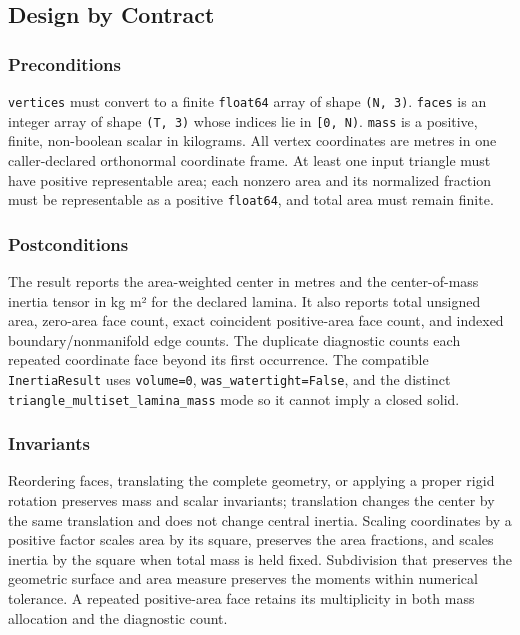 \documentclass[
  american,
]{article}
\begin{document}
\subsection{Design by Contract}\label{design-by-contract-1}

\subsubsection{Preconditions}\label{preconditions-1}

\texttt{vertices} must convert to a finite \texttt{float64} array of
shape \texttt{(N,\ 3)}. \texttt{faces} is an integer array of shape
\texttt{(T,\ 3)} whose indices lie in \texttt{{[}0,\ N)}. \texttt{mass}
is a positive, finite, non-boolean scalar in kilograms. All vertex
coordinates are metres in one caller-declared orthonormal coordinate
frame. At least one input triangle must have positive representable
area; each nonzero area and its normalized fraction must be
representable as a positive \texttt{float64}, and total area must remain
finite.

\subsubsection{Postconditions}\label{postconditions-1}

The result reports the area-weighted center in metres and the
center-of-mass inertia tensor in kg m² for the declared lamina. It also
reports total unsigned area, zero-area face count, exact coincident
positive-area face count, and indexed boundary/nonmanifold edge counts.
The duplicate diagnostic counts each repeated coordinate face beyond its
first occurrence. The compatible \texttt{InertiaResult} uses
\texttt{volume=0}, \texttt{was\_watertight=False}, and the distinct
\texttt{triangle\_multiset\_lamina\_mass} mode so it cannot imply a
closed solid.

\subsubsection{Invariants}\label{invariants-1}

Reordering faces, translating the complete geometry, or applying a
proper rigid rotation preserves mass and scalar invariants; translation
changes the center by the same translation and does not change central
inertia. Scaling coordinates by a positive factor scales area by its
square, preserves the area fractions, and scales inertia by the square
when total mass is held fixed. Subdivision that preserves the geometric
surface and area measure preserves the moments within numerical
tolerance. A repeated positive-area face retains its multiplicity in
both mass allocation and the diagnostic count.
\end{document}
